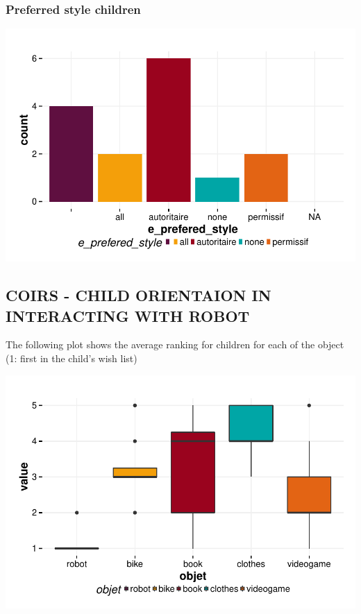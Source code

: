 \documentclass{article}
\begin{document}
\subsubsection{Preferred style children}
\includegraphics{interviews-plot_preferred_style_child}

\subsection{COIRS - CHILD ORIENTAION IN INTERACTING WITH ROBOT}

The following plot shows the average ranking for children for each of the object (1: first in the child's wish list)

\includegraphics{interviews-plot_coirs_child}
\end{document}
